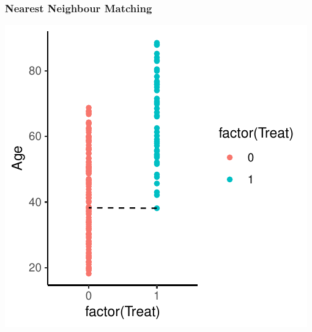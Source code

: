 \documentclass[xcolor=x11names,compress]{beamer}\usepackage[]{graphicx}\usepackage[]{color}
\makeatletter
\def\maxwidth{ %
  \ifdim\Gin@nat@width>\linewidth
    \linewidth
  \else
    \Gin@nat@width
  \fi
}
\newenvironment{knitrout}{}{} %
\renewcommand{\(}{\begin{columns}}
\renewcommand{\)}{\end{columns}}
\newcommand{\<}[1]{\begin{column}{#1}}
\renewcommand{\>}{\end{column}}
\makeatother
\begin{document}
\begin{frame}
\frametitle{Nearest Neighbour Matching}
\begin{center}
\begin{knitrout}
\color{fgcolor}
\includegraphics[width=\maxwidth]{figure/nearest_matching_2_pre-1} 

\end{knitrout}
\end{center}
\end{frame}
\end{document}
